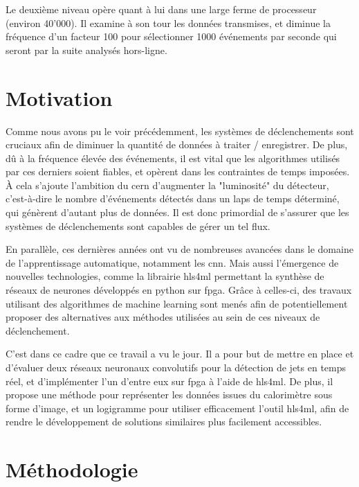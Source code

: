 Le deuxième niveau opère quant à lui dans une large ferme de processeur (environ 40'000). Il examine à son tour les données transmises, et diminue la fréquence d'un facteur 100 pour sélectionner 1000 événements par seconde qui seront par la suite analysés hors-ligne.


\section{Motivation}

Comme nous avons pu le voir précédemment, les systèmes de déclenchements sont cruciaux afin de diminuer la quantité de données à traiter / enregistrer. De plus, dû à la fréquence élevée des événements, il est vital que les algorithmes utilisés par ces derniers soient fiables, et opèrent dans les contraintes de temps imposées. À cela s'ajoute l'ambition du \acrshort{cern} d'augmenter la "luminosité" du détecteur, c'est-à-dire le nombre d'événements détectés dans un laps de temps déterminé, qui génèrent d'autant plus de données. Il est donc primordial de s'assurer que les systèmes de déclenchements sont capables de gérer un tel flux.

En parallèle, ces dernières années ont vu de nombreuses avancées dans le domaine de l'apprentissage automatique, notamment les \acrfull{cnn}. Mais aussi l'émergence de nouvelles technologies, comme la librairie \acrfull{hls4ml} permettant la synthèse de réseaux de neurones développés en python sur \acrshort{fpga}. Grâce à celles-ci, des travaux utilisant des algorithmes de machine learning sont menés afin de potentiellement proposer des alternatives aux méthodes utilisées au sein de ces niveaux de déclenchement.

C'est dans ce cadre que ce travail a vu le jour. Il a pour but de mettre en place et d'évaluer deux réseaux neuronaux convolutifs pour la détection de jets en temps réel, et d'implémenter l'un d'entre eux sur \acrshort{fpga} à l'aide de \acrshort{hls4ml}. De plus, il propose une méthode pour représenter les données issues du calorimètre sous forme d'image, et un logigramme pour utiliser efficacement l'outil \acrshort{hls4ml}, afin de rendre le développement de solutions similaires plus facilement accessibles.


\section{Méthodologie}

